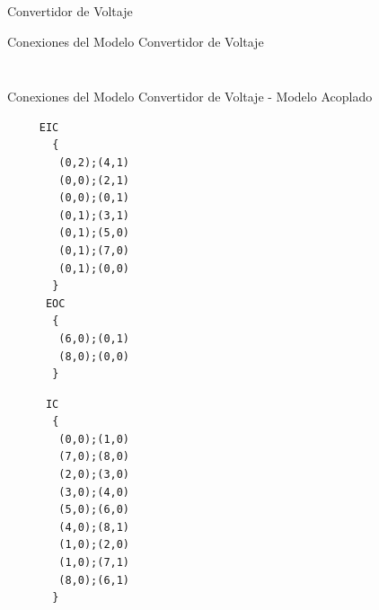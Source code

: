 \documentclass{beamer}
\begin{document}
\begin{frame}[fragile]{Convertidor de Voltaje}
\begin{figure}[H]
\begin{minipage}[t][][b]{.40\textwidth}
{
}
        \end{minipage}%
\end{figure}
\end{frame}

\begin{frame}[fragile]{Conexiones del Modelo Convertidor de Voltaje} 
\begin{minipage}[t]{0.3\linewidth}
\inputminted[linenos,lastline=13]{text}{conexiones-buck_disk.txt}
\end{minipage}\hfill
\begin{minipage}[t]{0.3\linewidth}
\inputminted[linenos,firstline=14]{text}{conexiones-buck_disk.txt}
\end{minipage}
\end{frame}

\begin{frame}[fragile]{Conexiones del Modelo Convertidor de Voltaje - Modelo Acoplado} 
\begin{minipage}{0.4\textwidth}
\begin{verbatim}
     EIC
       {
        (0,2);(4,1)
        (0,0);(2,1)
        (0,0);(0,1)
        (0,1);(3,1)
        (0,1);(5,0)
        (0,1);(7,0)
        (0,1);(0,0)
       }
      EOC
       {
        (6,0);(0,1)
        (8,0);(0,0)
       }
\end{verbatim}
\end{minipage}
\begin{minipage}{0.4\textwidth}
\begin{verbatim}
      IC
       {
        (0,0);(1,0)
        (7,0);(8,0)
        (2,0);(3,0)
        (3,0);(4,0)
        (5,0);(6,0)
        (4,0);(8,1)
        (1,0);(2,0)
        (1,0);(7,1)
        (8,0);(6,1)
       }
\end{verbatim}
\end{minipage}
\end{frame}
\end{document}
